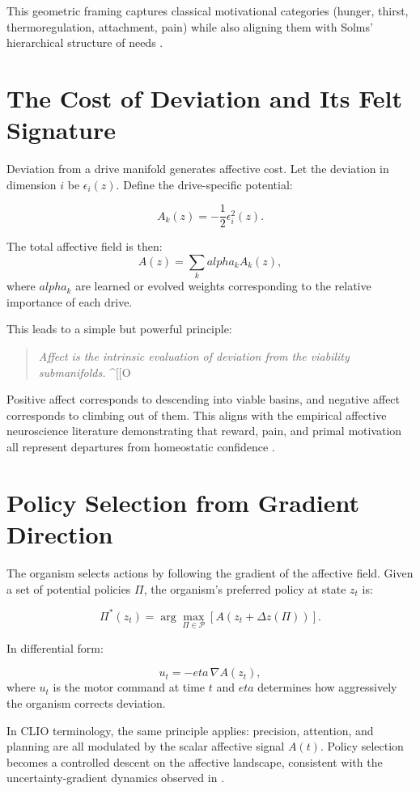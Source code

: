 \documentclass[12pt,oneside]{book}
\theoremstyle{plain}
\theoremstyle{definition}
\let\citep\parencite
\def\alpha{alpha}%
\def\eta{eta}%
\begin{document}
This geometric framing captures classical motivational categories
(hunger, thirst, thermoregulation, attachment, pain) while also aligning
them with Solms’ hierarchical structure of needs
\citep{solms2021hidden,panksepp2012archeology}.

\section{The Cost of Deviation and Its Felt Signature}

Deviation from a drive manifold generates affective cost.
Let the deviation in dimension $i$ be $\epsilon_i(z)$.
Define the drive-specific potential:

\[
A_k(z) = -\frac{1}{2} \epsilon_i^2(z).
\]

The total affective field is then:
\[
A(z) = \sum_{k} \alpha_k A_k(z),
\]
where $\alpha_k$ are learned or evolved weights corresponding to the
relative importance of each drive.

This leads to a simple but powerful principle:

\begin{quote}
\emph{Affect is the intrinsic evaluation of deviation from the viability
submanifolds.}
^[[O\end{quote}

Positive affect corresponds to descending into viable basins,
and negative affect corresponds to climbing out of them.
This aligns with the empirical affective neuroscience literature
demonstrating that reward, pain, and primal motivation all represent
departures from homeostatic confidence \citep{corr2016psychology}.

\section{Policy Selection from Gradient Direction}

The organism selects actions by following the gradient of the affective
field.
Given a set of potential policies $\Pi$, the organism’s preferred policy
at state $z_t$ is:

\[
\Pi^*(z_t) =
\arg\max_{\Pi \in \mathcal{P}}
\left[
A\!\left( z_t + \Delta z(\Pi) \right)
\right].
\]

In differential form:

\[
u_t = - \eta \, \nabla A(z_t),
\]
where $u_t$ is the motor command at time $t$ and $\eta$ determines
how aggressively the organism corrects deviation.

In CLIO terminology, the same principle applies:
precision, attention, and planning are all modulated by the scalar
affective signal $A(t)$.
Policy selection becomes a controlled descent on the affective landscape,
consistent with the uncertainty-gradient dynamics observed in
\citep{cheng2025cognitive}.
\end{document}
